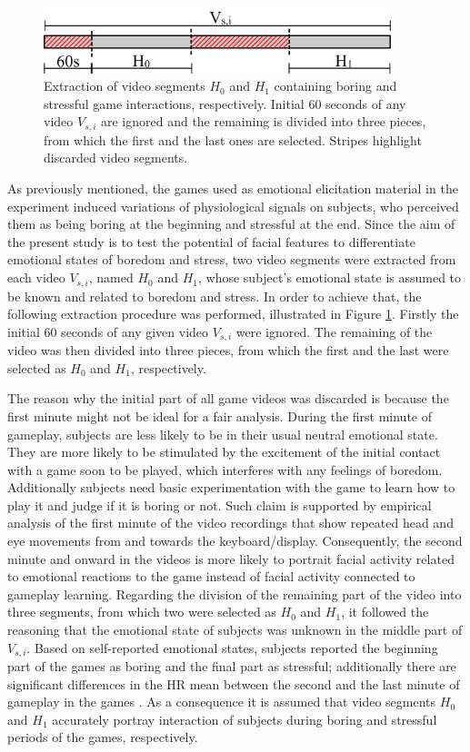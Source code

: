 \begin{figure}
\centering
\includegraphics[width=0.9\textwidth]{figures/pre-processing}
\caption{Extraction of video segments $H_0$ and $H_1$ containing boring and stressful game interactions, respectively. Initial 60 seconds of any video $V_{s,i}$ are ignored and the remaining is divided into three pieces, from which the first and the last ones are selected. Stripes highlight discarded video segments.}
\label{fig:preprocessing}
\end{figure}

As previously mentioned, the games used as emotional elicitation material in the experiment induced variations of physiological signals on subjects, who perceived them as being boring at the beginning and stressful at the end. Since the aim of the present study is to test the potential of facial features to differentiate emotional states of boredom and stress, two video segments were extracted from each video $V_{s,i}$, named $H_0$ and $H_1$, whose subject's emotional state is assumed to be known and related to boredom and stress. In order to achieve that, the following extraction procedure was performed, illustrated in Figure \ref{fig:preprocessing}. Firstly the initial 60 seconds of any given video $V_{s,i}$ were ignored. The remaining of the video was then divided into three pieces, from which the first and the last were selected as $H_0$ and $H_1$, respectively.

The reason why the initial part of all game videos was discarded is because the first minute might not be ideal for a fair analysis. During the first minute of gameplay, subjects are less likely to be in their usual neutral emotional state. They are more likely to be stimulated by the excitement of the initial contact with a game soon to be played, which interferes with any feelings of boredom. Additionally subjects need basic experimentation with the game to learn how to play it and judge if it is boring or not. Such claim is supported by empirical analysis of the first minute of the video recordings that show repeated head and eye movements from and towards the keyboard/display. Consequently, the second minute and onward in the videos is more likely to portrait facial activity related to emotional reactions to the game instead of facial activity connected to gameplay learning. Regarding the division of the remaining part of the video into three segments, from which two were selected as $H_0$ and $H_1$, it followed the reasoning that the emotional state of subjects was unknown in the middle part of $V_{s,i}$. Based on self-reported emotional states, subjects reported the beginning part of the games as boring and the final part as stressful; additionally there are significant differences in the HR mean between the second and the last minute of gameplay in the games \parencite{bevilacqua2018changes}. As a consequence it is assumed that video segments $H_0$ and $H_1$ accurately portray interaction of subjects during boring and stressful periods of the games, respectively.

